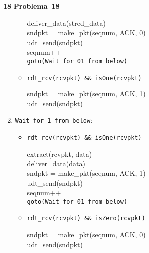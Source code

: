 \documentclass{article}
\newcounter{exe-list}
\newenvironment{exe}[2][Problema]
    {\newcommand{\opt}{(Opcional)}%
    \newcommand{\sketch}[1]{{\bfseries Rascunho:} ##1}%
    \medskip\par\noindent\ifthenelse{\equal{#1}{}}
        {\textbf{\large #2}}
        {\textbf{\large #1~#2}}%
    \medskip\par\noindent}
    {\medskip}
\begin{document}
\begin{exe}{18}
\begin{enumerate}
\begin{itemize}
                    deliver\_data(stred\_data) \\
                    sndpkt = make\_pkt(seqnum, ACK, 0) \\
                    udt\_send(sndpkt) \\
                    seqnum++ \\
                    \texttt{goto(Wait for 01 from below)}
                \item \texttt{rdt\_rcv(rcvpkt)
                        \&\& isOne(rcvpkt)} \par
                    sndpkt = make\_pkt(seqnum, ACK, 1) \\
                    udt\_send(sndpkt)
            \end{itemize}
        \item \texttt{Wait for 1 from below}:
            \begin{itemize}
                \item \texttt{rdt\_rcv(rcvpkt)
                        \&\& isOne(rcvpkt)} \par
                    extract(rcvpkt, data) \\
                    deliver\_data(data) \\
                    sndpkt = make\_pkt(seqnum, ACK, 1) \\
                    udt\_send(sndpkt) \\
                    seqnum++ \\
                    \texttt{goto(Wait for 01 from below)}
                \item \texttt{rdt\_rcv(rcvpkt)
                        \&\& isZero(rcvpkt)} \par
                    sndpkt = make\_pkt(seqnum, ACK, 0) \\
                    udt\_send(sndpkt)
            \end{itemize}
    \end{enumerate}


\end{exe}
\end{document}

